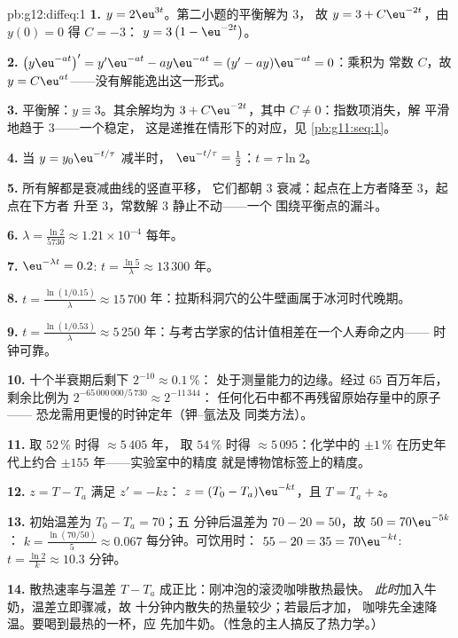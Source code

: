 \begin{solution}{pb:g12:diffeq:1}
\textbf{1.} $y = 2\eu^{3t}$。第二小题的平衡解为 $3$，
故 $y = 3 + C\eu^{-2t}$，由 $y(0) = 0$ 得 $C = -3$：
$y = 3\left(1 - \eu^{-2t}\right)$。

\textbf{2.} $\left(y\eu^{-at}\right)' = y'\eu^{-at} -
ay\eu^{-at} = (y' - ay)\eu^{-at} = 0$：乘积为
常数 $C$，故 $y = C\eu^{at}$——没有解能逸出这一形式。

\textbf{3.} 平衡解：$y \equiv 3$。其余解均为
$3 + C\eu^{-2t}$，其中 $C \neq 0$：指数项消失，解
平滑地趋于 $3$——一个稳定，
这是递推在情形下的对应，见
\cref{pb:g11:seq:1}。

\textbf{4.} 当 $y = y_0\eu^{-t/\tau}$ 减半时，
$\eu^{-t/\tau} = \frac12$：$t = \tau\ln 2$。

\textbf{5.} 所有解都是衰减曲线的竖直平移，
它们都朝 $3$ 衰减：起点在上方者降至 $3$，起点在下方者
升至 $3$，常数解 $3$ 静止不动——一个
围绕平衡点的漏斗。

\textbf{6.} $\lambda = \frac{\ln 2}{5730} \approx 1.21 \times
10^{-4}$ 每年。

\textbf{7.} $\eu^{-\lambda t} = 0.2$:
$t = \frac{\ln 5}{\lambda} \approx 13\,300$ 年。

\textbf{8.} $t = \frac{\ln(1/0.15)}{\lambda} \approx 15\,700$
年：拉斯科洞穴的公牛壁画属于冰河时代晚期。

\textbf{9.} $t = \frac{\ln(1/0.53)}{\lambda} \approx 5\,250$
年：与考古学家的估计值相差在一个人寿命之内——
时钟可靠。

\textbf{10.} 十个半衰期后剩下 $2^{-10} \approx 0.1\,\%$：
处于测量能力的边缘。经过 $65$ 百万年后，
剩余比例为 $2^{-65\,000\,000/5\,730} \approx 2^{-11\,344}$：
任何化石中都不再残留原始存量中的原子——
恐龙需用更慢的时钟定年（钾--氩法及
同类方法）。

\textbf{11.} 取 $52\,\%$ 时得 $\approx 5\,405$ 年，
取 $54\,\%$ 时得 $\approx 5\,095$：化学中的 $\pm 1\,\%$
在历史年代上约合 $\pm 155$ 年——实验室中的精度
就是博物馆标签上的精度。

\textbf{12.} $z = T - T_a$ 满足 $z' = -kz$：
$z = (T_0 - T_a)\eu^{-kt}$，且 $T = T_a + z$。

\textbf{13.} 初始温差为 $T_0 - T_a = 70$；五
分钟后温差为 $70 - 20 = 50$，故 $50 = 70\eu^{-5k}$：
$k = \frac{\ln(70/50)}{5} \approx 0.067$ 每分钟。可饮用时：
$55 - 20 = 35 = 70\eu^{-kt}$:
$t = \frac{\ln 2}{k} \approx 10.3$ 分钟。

\textbf{14.} 散热速率与温差
$T - T_a$ 成正比：刚冲泡的滚烫咖啡散热最快。
\emph{此时}加入牛奶，温差立即骤减，故
十分钟内散失的热量较少；若最后才加，
咖啡先全速降温。要喝到最热的一杯，应
先加牛奶。（性急的主人搞反了热力学。）


\end{solution}
